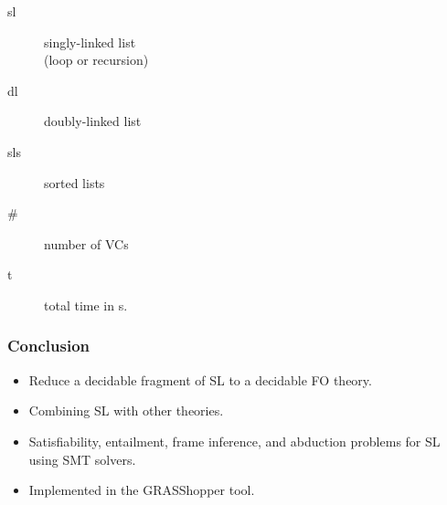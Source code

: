 \documentclass{beamer}
\begin{document}
\begin{frame}
\begin{minipage}{.5\linewidth}
\begin{description}
\item[sl] singly-linked list\\ (loop or recursion)
\item[dl] doubly-linked list
\item[sls] sorted lists
\end{description}
\end{minipage}
\begin{minipage}{.45\linewidth}
\begin{description}
\item[\#] number of VCs
\item[t] total time in s.
\end{description}
\end{minipage}
\end{frame}

\begin{frame}
  \frametitle{Conclusion}

  \begin{itemize}
  \item Reduce a decidable fragment of SL to a decidable FO theory.
  \item Combining SL with other theories.
  \item Satisfiability, entailment, frame inference, and abduction problems for SL using SMT solvers.
  \item Implemented in the GRASShopper tool.
  \end{itemize}

\end{frame}
\end{document}
